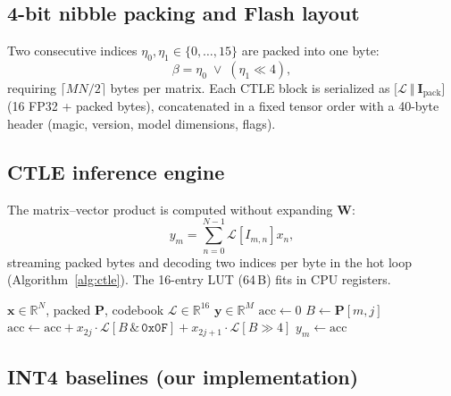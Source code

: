 \documentclass[lettersize,journal]{IEEEtran}
\begin{document}
\subsection{4-bit nibble packing and Flash layout}
\label{subsec:packing}

Two consecutive indices $\eta_0,\eta_1\in\{0,\dots,15\}$ are packed into one
byte:
\begin{equation}
\beta = \eta_0 \;\lor\; (\eta_1 \ll 4),
\end{equation}
requiring $\lceil MN/2\rceil$ bytes per matrix.
Each CTLE block is serialized as
$\bigl[\mathcal{L}\ \Vert\ \mathbf{I}_\mathrm{pack}\bigr]$
(16 FP32 + packed bytes), concatenated in a fixed tensor order with a 40-byte
header (magic, version, model dimensions, flags).

\subsection{CTLE inference engine}
\label{subsec:engine}

The matrix--vector product is computed without expanding $\mathbf{W}$:
\begin{equation}
y_m = \sum_{n=0}^{N-1} \mathcal{L}\!\left[I_{m,n}\right] x_n,
\label{eq:matvec}
\end{equation}
streaming packed bytes and decoding two indices per byte in the hot loop
(Algorithm~\ref{alg:ctle}). The 16-entry LUT (64\,B) fits in CPU registers.

\begin{algorithm}[t]
\caption{CTLE fused Tensor--LUT kernel ($N$ even).}
\label{alg:ctle}
\begin{algorithmic}[1]
\REQUIRE $\mathbf{x}\in\mathbb{R}^N$, packed $\mathbf{P}$, codebook
$\mathcal{L}\in\mathbb{R}^{16}$
\ENSURE $\mathbf{y}\in\mathbb{R}^M$
    \STATE $\mathrm{acc} \gets 0$
        \STATE $B \gets \mathbf{P}[m,j]$
        \STATE $\mathrm{acc} \gets \mathrm{acc}
               + x_{2j}\cdot\mathcal{L}[B\,\&\,\mathtt{0x0F}]
               + x_{2j+1}\cdot\mathcal{L}[B\!\gg\!4]$
    \ENDFOR
    \STATE $y_m \gets \mathrm{acc}$
\ENDFOR
\end{algorithmic}
\end{algorithm}

\subsection{INT4 baselines (our implementation)}
\label{subsec:int4baselines}
\end{document}
